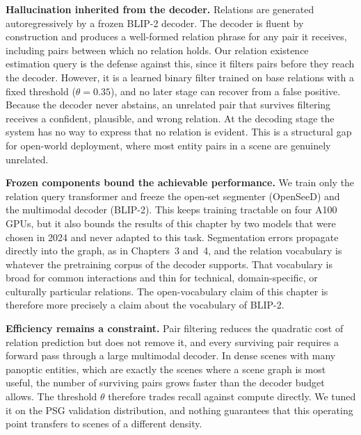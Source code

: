 \noindent \textbf{Hallucination inherited from the decoder.}
Relations are generated autoregressively by a frozen BLIP-2 decoder. The decoder is fluent by construction and produces a well-formed relation phrase for any pair it receives, including pairs between which no relation holds. Our relation existence estimation query is the defense against this, since it filters pairs before they reach the decoder. However, it is a learned binary filter trained on base relations with a fixed threshold ($\theta = 0.35$), and no later stage can recover from a false positive. Because the decoder never abstains, an unrelated pair that survives filtering receives a confident, plausible, and wrong relation. At the decoding stage the system has no way to express that no relation is evident. This is a structural gap for open-world deployment, where most entity pairs in a scene are genuinely unrelated.

\noindent \textbf{Frozen components bound the achievable performance.}
We train only the relation query transformer and freeze the open-set segmenter (OpenSeeD) and the multimodal decoder (BLIP-2). This keeps training tractable on four A100 GPUs, but it also bounds the results of this chapter by two models that were chosen in 2024 and never adapted to this task. Segmentation errors propagate directly into the graph, as in Chapters~3 and~4, and the relation vocabulary is whatever the pretraining corpus of the decoder supports. That vocabulary is broad for common interactions and thin for technical, domain-specific, or culturally particular relations. The open-vocabulary claim of this chapter is therefore more precisely a claim about the vocabulary of BLIP-2.

\noindent \textbf{Efficiency remains a constraint.}
Pair filtering reduces the quadratic cost of relation prediction but does not remove it, and every surviving pair requires a forward pass through a large multimodal decoder. In dense scenes with many panoptic entities, which are exactly the scenes where a scene graph is most useful, the number of surviving pairs grows faster than the decoder budget allows. The threshold $\theta$ therefore trades recall against compute directly. We tuned it on the PSG validation distribution, and nothing guarantees that this operating point transfers to scenes of a different density.

